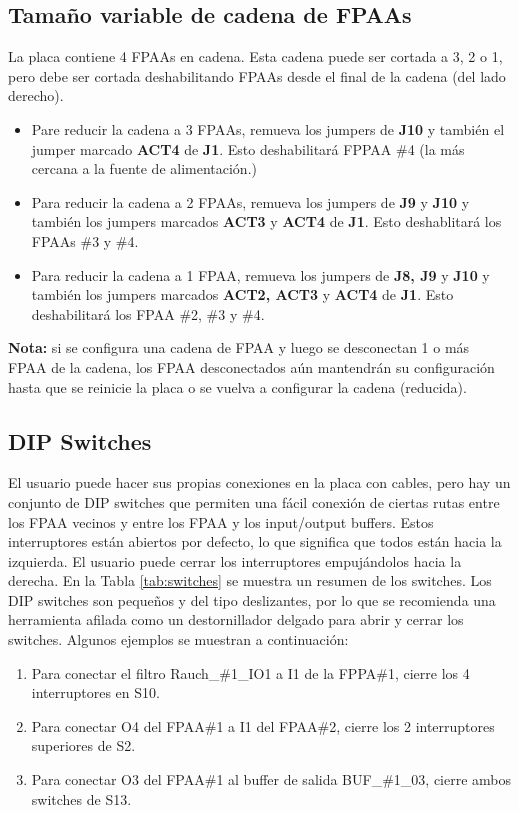 		\subsection{Tamaño variable de cadena de FPAAs}

	La placa contiene 4 FPAAs en cadena. Esta cadena puede ser cortada a 3, 2 o 1, pero debe ser cortada deshabilitando FPAAs desde el final de la cadena (del lado derecho).

	\begin{itemize}
		\item Pare reducir la cadena a 3 FPAAs, remueva los jumpers de \textbf{J10} y también el jumper marcado \textbf{ACT4} de \textbf{J1}. Esto deshabilitará FPPAA \#4 (la más cercana a la fuente de alimentación.)
		\item Para reducir la cadena a 2 FPAAs, remueva los jumpers de \textbf{J9} y \textbf{J10} y también los jumpers marcados \textbf{ACT3} y \textbf{ACT4} de \textbf{J1}. Esto deshablitará los FPAAs \#3 y \#4.
		\item Para reducir la cadena a 1 FPAA, remueva los jumpers de \textbf{J8, J9} y \textbf{J10} y  también los jumpers marcados \textbf{ACT2, ACT3} y \textbf{ACT4} de \textbf{J1}. Esto deshabilitará los FPAA \#2, \#3 y \#4.
	\end{itemize}
	\textbf{Nota:} si se configura una cadena de FPAA y luego se desconectan 1 o más FPAA de la cadena, los FPAA desconectados aún mantendrán su configuración hasta que se reinicie la placa o se vuelva a configurar la cadena (reducida).

	\subsection{DIP Switches}
	
	El usuario puede hacer sus propias conexiones en la placa con cables, pero hay un conjunto de DIP switches que permiten una fácil conexión de ciertas rutas entre los FPAA vecinos y entre los FPAA y los input/output buffers. Estos interruptores están abiertos por defecto, lo que significa que todos están hacia la izquierda. El usuario puede cerrar los interruptores empujándolos hacia la derecha. En la Tabla \ref{tab:switches} se muestra un resumen de los switches. Los DIP switches son pequeños y del tipo deslizantes, por lo que se recomienda una herramienta afilada como un destornillador delgado para abrir y cerrar los switches. Algunos ejemplos se muestran a continuación:
	
	\begin{enumerate}
		\item Para conectar el filtro Rauch\_\#1\_IO1 a I1 de la FPPA\#{}1, cierre los 4 interruptores en S10.
		\item Para conectar O4 del FPAA\#{}1 a I1 del FPAA\#{}2, cierre los 2 interruptores superiores de S2.
		\item Para conectar O3 del FPAA\#{}1 al buffer de salida BUF\_\#1\_03, cierre ambos switches de S13.
	\end{enumerate}


